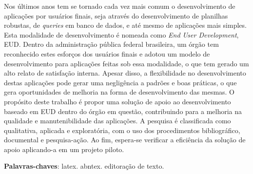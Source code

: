 \begin{resumo}

Nos últimos anos tem se tornado cada vez mais comum o desenvolvimento de aplicações por usuários finais, seja através do desenvolvimento de planilhas robustas, de \textit{queries} em banco de dados, e até mesmo de aplicações mais simples. Esta modalidade de desenvolvimento é nomeada como \textit{End User Development}, EUD. Dentro da administração pública federal brasileira, um órgão tem reconhecido estes esforços dos usuários finais e adotou um modelo de desenvolvimento para aplicações feitas sob essa modalidade, o que tem gerado um alto relato de satisfação interna. Apesar disso, a flexibilidade no desenvolvimento destas aplicações pode gerar uma negligência a padrões e boas práticas, o que gera oportunidades de melhoria na forma de desenvolvimento das mesmas. O propósito deste trabalho é propor uma solução de apoio ao desenvolvimento baseado em EUD dentro do órgão em questão, contribuindo para a melhoria na qualidade e manutenibilidade das aplicações. A pesquisa é classificada como qualitativa, aplicada e exploratória, com o uso dos procedimentos bibliográfico, documental e pesquisa-ação. Ao fim, espera-se verificar a eficiência da solução de apoio aplicando-a em um projeto piloto.


 \vspace{\onelineskip}
    
 \noindent
 \textbf{Palavras-chaves}: latex. abntex. editoração de texto.
\end{resumo}
